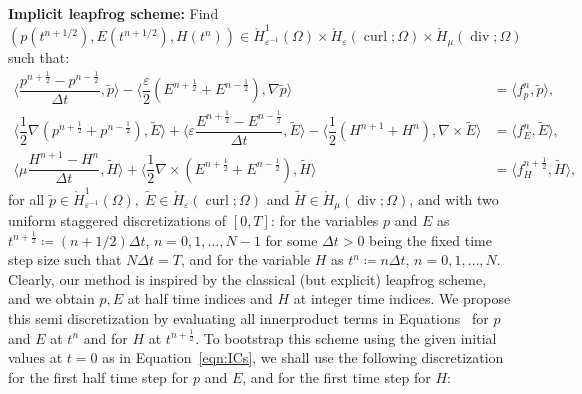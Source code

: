 \documentclass{amsart}
\theoremstyle{thmstyleone}%
\theoremstyle{thmstyletwo}%
\theoremstyle{thmstylethree}%
\DeclareMathOperator{\curl}{curl}
\def\divgn{\operatorname{div}}
\newcommand{\aInnerproduct}[2]{\bigl\langle #1, #2 \bigr\rangle}
\begin{document}
\smallskip \noindent \textbf{Implicit leapfrog scheme:} Find $(p(t^{n + 1/2}), E(t^{n + 1/2}), H(t^n)) \in \mathring{H}^1_{\varepsilon^{-1}}(\Omega) \times \mathring{H}_{\varepsilon}(\curl; \Omega) \times \mathring{H}_{\mu}(\divgn; \Omega)$ such that:
\begin{subequations}
\begin{align}
  \aInnerproduct{\dfrac{p^{n + \frac{1}{2}} - p^{n - \frac{1}{2}}}{\Delta t}}{\widetilde{p}} - \aInnerproduct{\dfrac{\varepsilon}{2} \left( E^{n + \frac{1}{2}} + E^{n - \frac{1}{2}} \right)}{\nabla \widetilde{p}} &= \aInnerproduct{ f_p^{n}}{\widetilde{p}}, \label{eqn:maxwell_p_lf} \\
  \aInnerproduct{\dfrac{1}{2} \nabla \left(p^{n + \frac{1}{2}} + p^{n - \frac{1}{2}} \right)}{\widetilde{E}} + \aInnerproduct{\varepsilon \dfrac{E^{n + \frac{1}{2}} - E^{n - \frac{1}{2}}}{\Delta t}}{\widetilde{E}} - \aInnerproduct{\dfrac{1}{2} \left( H^{n + 1} + H^n \right)}{\nabla \times \widetilde{E}} &= \aInnerproduct{f_E^n}{\widetilde{E}}, \label{eqn:maxwell_E_lf} \\
  \aInnerproduct{\mu \dfrac{H^{n + 1} - H^n}{\Delta t}}{\widetilde{H}} +  \aInnerproduct{\dfrac{1}{2} \nabla \times \left( E^{n + \frac{1}{2}} + E^{n - \frac{1}{2}} \right)}{\widetilde{H}} &= \aInnerproduct{f_H^{n + \frac{1}{2}}}{\widetilde{H}}, \label{eqn:maxwell_H_lf}
\end{align}
\end{subequations}
for all $\widetilde{p} \in \mathring{H}^1_{\varepsilon^{-1}}(\Omega), \; \widetilde{E} \in \mathring{H}_{\varepsilon}(\curl; \Omega)$ and $\widetilde{H} \in \mathring{H}_{\mu}(\divgn; \Omega)$, and with two uniform staggered discretizations of $[0, T]$: for the variables $p$ and $E$ as $t^{n + \frac{1}{2}} \coloneq (n + 1/2) \Delta t$, $n = 0, 1, \dots, N - 1$ for some $\Delta t > 0$ being the fixed time step size such that $N \Delta t = T$, and for the variable $H$ as $t^n \coloneq n \Delta t$, $n = 0, 1, \dots, N$. Clearly, our method is inspired by the classical (but explicit) leapfrog scheme, and we obtain $p, E$ at half time indices and $H$ at integer time indices. We propose this semi discretization by evaluating all innerproduct terms in Equations~ for $p$ and $E$ at $t^n$ and for $H$ at $t^{n+\frac{1}{2}}$. To bootstrap this scheme using the given initial values at $t = 0$ as in Equation~\eqref{eqn:ICs}, we shall use the following discretization for the first half time step for $p$ and $E$, and for the first time step for $H$:
\end{document}
